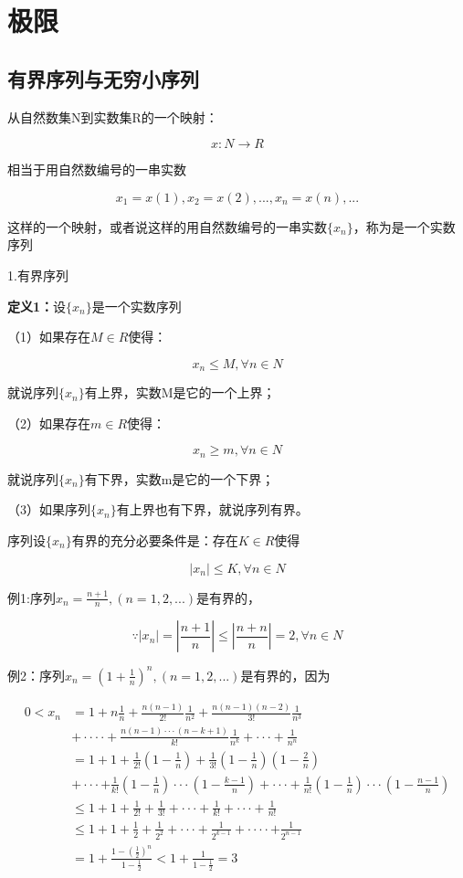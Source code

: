 \documentclass{ctexart}
\begin{document}
	\section{极限}
	\subsection{有界序列与无穷小序列}
	
	从自然数集N到实数集R的一个映射：
	
	\[x: N \to R\]
	
	相当于用自然数编号的一串实数
	
	\[x_1 = x(1), x_2 = x(2),...,x_n=x(n),...\]
	
	这样的一个映射，或者说这样的用自然数编号的一串实数\(\{x_n\}\)，称为是一个实数序列
	
	1.有界序列
	
	\textbf{定义1：}设\(\{x_n\}\)是一个实数序列
	
	（1）如果存在\(M \in R\)使得：
	
	\[x_n \leq M, \forall n \in N\]
	
	就说序列\(\{x_n\}\)有上界，实数M是它的一个上界；
	
	（2）如果存在\(m \in R\)使得：
	
	\[x_n \geq m, \forall n \in N\]
	
	就说序列\(\{x_n\}\)有下界，实数m是它的一个下界；
	
	（3）如果序列\(\{x_n\}\)有上界也有下界，就说序列有界。
	
	序列设\(\{x_n\}\)有界的充分必要条件是：存在\(K \in R\)使得
	
	\[|x_n| \leq K, \forall n \in N\]
	
	例1:序列\(x_n=\frac{n+1}{n},(n=1,2,...)\)是有界的，
	
	\[\because |x_n|=|\frac{n+1}{n}| \leq |\frac{n+n}{n}| = 2, \forall n \in N\]
	
	例2：序列\(x_n=(1+\frac{1}{n})^n,(n=1,2,...)\)是有界的，因为
	
	\begin{align*}
	0 < x_n &= 1+n\frac{1}{n}+\frac{n(n-1)}{2!}\frac{1}{n^2}+\frac{n(n-1)(n-2)}{3!}\frac{1}{n^3} \\
	& +····+\frac{n(n-1)···(n-k+1)}{k!}\frac{1}{n^k}+···+\frac{1}{n^n} \\
	&= 1+1+\frac{1}{2!}(1-\frac{1}{n})+\frac{1}{3!}(1-\frac{1}{n})(1-\frac{2}{n}) \\
	&+···+\frac{1}{k!}(1-\frac{1}{n})···(1-\frac{k-1}{n})+···+\frac{1}{n!}(1-\frac{1}{n})···(1-\frac{n-1}{n}) \\
	&\leq 1+1+\frac{1}{2!}+\frac{1}{3!}+···+\frac{1}{k!}+···+\frac{1}{n!} \\
	& \leq 1+1+\frac{1}{2}+\frac{1}{2^2}+···+\frac{1}{2^{k-1}}+····+\frac{1}{2^{n-1}} \\
	&= 1+\frac{1-(\frac{1}{2})^n}{1-\frac{1}{2}} < 1+\frac{1}{1-\frac{1}{2}} = 3 \\
	\end{align*}
	
\end{document}
